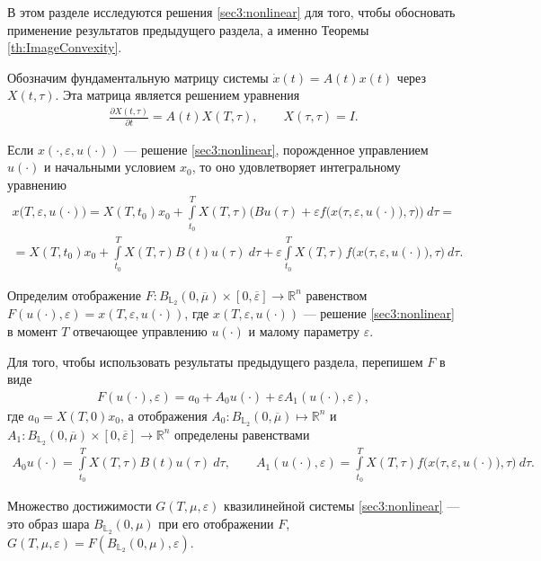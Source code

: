 \documentclass[../main.tex]{subfiles}
\begin{document}
В этом разделе исследуются решения \eqref{sec3:nonlinear} для того, чтобы обосновать применение результатов предыдущего раздела, а именно Теоремы \ref{th:ImageConvexity}. 

Обозначим фундаментальную матрицу системы $\dot{x}(t) = A(t) x(t)$ через $X(t,\tau)$.
Эта матрица является решением уравнения
\begin{gather*}
    \frac{\partial X(t,\tau)}{\partial t} = A(t) X(T,\tau), \qquad X(\tau,\tau) = I.
\end{gather*}

Если $x(\cdot,\varepsilon, u(\cdot))$ --- решение \eqref{sec3:nonlinear}, порожденное управлением $u(\cdot)$ и начальными условием $x_0$,  то оно удовлетворяет интегральному уравнению
\begin{gather*}
    x\big(T,\varepsilon, u(\cdot)\big) =
    X(T,t_0)x_0 + 
    \int\limits_{t_0}^T X(T,\tau) \bigg(Bu(\tau) +
    \varepsilon f\Big(x\big(\tau,\varepsilon, u(\cdot)\big),\tau\Big) \bigg)\ d\tau = \\ =
    X(T,t_0)x_0 +
    \int\limits_{t_0}^T X(T,\tau) B(t)u(\tau)\ d\tau 
    + \varepsilon \int\limits_{t_0}^T X(T,\tau) f\Big(x\big(\tau,\varepsilon, u(\cdot)\big),\tau\Big) \ d\tau.
\end{gather*}

Определим отображение $F:B_{\mathbb{L}_2}(0,\overline{\mu})\times [0,\overline{\varepsilon}] \to \mathbb{R}^n$ равенством $F(u(\cdot),\varepsilon) = x(T,\varepsilon,u(\cdot))$, где $x(T,\varepsilon,u(\cdot))$ --- решение \eqref{sec3:nonlinear} в момент $T$ отвечающее управлению $u(\cdot)$ и малому параметру $\varepsilon$.

Для того, чтобы использовать результаты предыдущего раздела, перепишем  $F$ в виде
\begin{gather*}
    F(u(\cdot),\varepsilon) = a_0 + A_0 u(\cdot) + \varepsilon A_1(u(\cdot), \varepsilon), 
\end{gather*}
где $a_0 = X(T,0)x_0 $, а отображения $A_0: B_{\mathbb{L}_2}(0,\overline{\mu})  \mapsto \mathbb{R}^n$ и $A_1: B_{\mathbb{L}_2}(0,\overline{\mu}) \times [0,\overline{\varepsilon}] \to \mathbb{R}^n$ определены равенствами
\begin{gather}\label{A1_def}
    A_0 u(\cdot) = \int\limits_{t_0}^T X(T,\tau) B(t)u(\tau)\ d\tau, \qquad
    A_1(u(\cdot),\varepsilon) = \int\limits_{t_0}^T X(T,\tau) f\Big(x\big(\tau,\varepsilon, u(\cdot)\big),\tau\Big) \ d\tau.
\end{gather}

Множество достижимости $G(T,\mu,\varepsilon) $  квазилинейной системы \eqref{sec3:nonlinear} --- это образ шара $B_{\mathbb{L}_2}(0,\mu)$ при его отображении $F$, $G(T,\mu,\varepsilon) = F(B_{\mathbb{L}_2}(0,\mu),\varepsilon)$.
\end{document}
